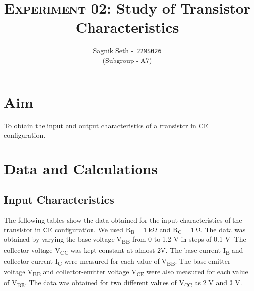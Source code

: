\documentclass{scrartcl}
\title{
        \Large\textsc{Experiment 02: }
        \huge\textbf{Study of Transistor Characteristics} \\
}
\author{{\Large Sagnik Seth} -\   \texttt{22MS026}\\ ({\small Subgroup - A7}) }
\date{}
\begin{document}
\maketitle
\section{Aim}
To obtain the input and output characteristics of a transistor in CE configuration.
 
\section{Data and Calculations}
\subsection{Input Characteristics}
The following tables show the data obtained for the input characteristics of the transistor in CE configuration.  We used $\mathrm{R_B = 1 \ k\Omega}$ and $\mathrm{R_C = 1 \ \Omega}$. The data was obtained by varying the base voltage V\textsubscript{BB} from 0 to 1.2 V in steps of 0.1 V. The collector voltage V\textsubscript{CC} was kept constant at almost $\mathrm{2 V}$. The base current I\textsubscript{B} and collector current I\textsubscript{C} were measured for each value of V\textsubscript{BB}. The base-emitter voltage V\textsubscript{BE} and collector-emitter voltage V\textsubscript{CE} were also measured for each value of V\textsubscript{BB}. The data was obtained for two different values of V\textsubscript{CC} as 2 V and 3 V. 
\end{document}
